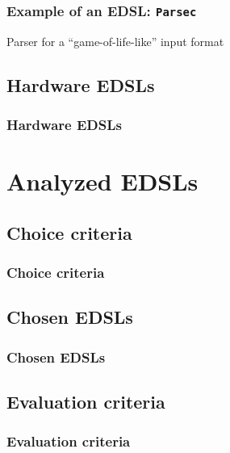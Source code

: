 \documentclass{beamer}
\begin{document}
            \begin{frame}[fragile]
                \frametitle{Example of an EDSL: \texttt{Parsec}}

                \begin{listing}[h!]
                    \caption{Parser for a ``game-of-life-like'' input format
                        \label{lst:parsec-example}}
                \end{listing}
            \end{frame}


        \subsection{Hardware EDSLs}
        \label{subsec:hardware-edsls}
            \begin{frame}
                \frametitle{Hardware EDSLs}

            \end{frame}


    \section{Analyzed EDSLs}
    \label{sec:analyzed-edsls}
        \frame{\sectionpage}

        \subsection{Choice criteria}
        \label{subsec:edsls-choice-criteria}
            \begin{frame}
                \frametitle{Choice criteria}
            \end{frame}

        \subsection{Chosen EDSLs}
        \label{subsec:chosen-edsls}
            \begin{frame}
                \frametitle{Chosen EDSLs}
            \end{frame}

        \subsection{Evaluation criteria}
        \label{subsec:evaluation-criteria}
            \begin{frame}
                \frametitle{Evaluation criteria}
            \end{frame}
\end{document}

